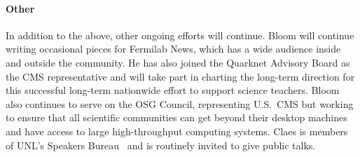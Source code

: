 \paragraph{Other} In addition to the above, other ongoing efforts will continue.  Bloom will continue writing occasional pieces for Fermilab News, which has a wide audience inside and outside the community.  He has also joined the Quarknet Advisory Board as the CMS representative and will take part in charting the long-term direction for this successful long-term nationwide effort to support science teachers.  Bloom also continues to serve on the OSG Council, representing U.S.~CMS but working to ensure that all scientific communities can get beyond their desktop machines and have access to large high-throughput computing systems. 
Claes is members of UNL's Speakers Bureau~\cite{bib:speakers} and is routinely invited to give public talks.
